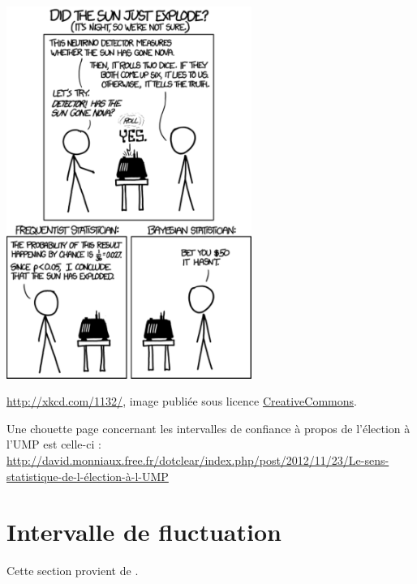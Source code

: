 

\begin{center}
            \includegraphics[width=8cm]{frequentists_vs_bayesians.pdf}

            \url{http://xkcd.com/1132/}, image publiée sous licence \href{http://xkcd.com/license.html}{CreativeCommons}.
\end{center}

Une chouette page concernant les intervalles de confiance à propos de l'élection à l'UMP est celle-ci :\\
\url{http://david.monniaux.free.fr/dotclear/index.php/post/2012/11/23/Le-sens-statistique-de-l-élection-à-l-UMP}

\section{Intervalle de fluctuation}

Cette section provient de \cite{JqcbOc}.

